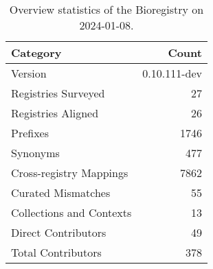 \begin{table}
\caption{Overview statistics of the Bioregistry on 2024-01-08.}
\label{tab:bioregistry-summary}
\begin{tabular}{lr}
\toprule
Category & Count \\
\midrule
Version & 0.10.111-dev \\
Registries Surveyed & 27 \\
Registries Aligned & 26 \\
Prefixes & 1746 \\
Synonyms & 477 \\
Cross-registry Mappings & 7862 \\
Curated Mismatches & 55 \\
Collections and Contexts & 13 \\
Direct Contributors & 49 \\
Total Contributors & 378 \\
\bottomrule
\end{tabular}
\end{table}
